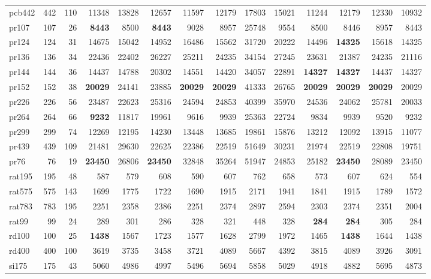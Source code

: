 {\begin{longtable}{l r r r r r r r r r r r r r}
pcb442 & 442 & 110 & 11348 & 13828 & 12657 & 11597 & 12179 & 17803 & 15021 & 11244 & 12179 & 12330 & 10932 \\
pr107 & 107 & 26 & \textbf{8443} & 8500 & \textbf{8443} & 9028 & 8957 & 25748 & 9554 & 8500 & 8446 & 8957 & 8443 \\
pr124 & 124 & 31 & 14675 & 15042 & 14952 & 16486 & 15562 & 31720 & 20222 & 14496 & \textbf{14325} & 15618 & 14325 \\
pr136 & 136 & 34 & 22436 & 22402 & 26227 & 25211 & 24235 & 34154 & 27245 & 23631 & 21387 & 24235 & 21116 \\
pr144 & 144 & 36 & 14437 & 14788 & 20302 & 14551 & 14420 & 34057 & 22891 & \textbf{14327} & \textbf{14327} & 14437 & 14327 \\
pr152 & 152 & 38 & \textbf{20029} & 24141 & 23885 & \textbf{20029} & \textbf{20029} & 41333 & 26765 & \textbf{20029} & \textbf{20029} & \textbf{20029} & 20029 \\
pr226 & 226 & 56 & 23487 & 22623 & 25316 & 24594 & 24853 & 40399 & 35970 & 24536 & 24062 & 25781 & 20033 \\
pr264 & 264 & 66 & \textbf{9232} & 11817 & 19961 & 9616 & 9939 & 25363 & 22724 & 9834 & 9939 & 9520 & 9232 \\
pr299 & 299 & 74 & 12269 & 12195 & 14230 & 13448 & 13685 & 19861 & 15876 & 13212 & 12092 & 13915 & 11077 \\
pr439 & 439 & 109 & 21481 & 29630 & 22625 & 22386 & 22519 & 51649 & 30231 & 21974 & 22519 & 22808 & 19751 \\
pr76 & 76 & 19 & \textbf{23450} & 26806 & \textbf{23450} & 32848 & 35264 & 51947 & 24853 & 25182 & \textbf{23450} & 28089 & 23450 \\
rat195 & 195 & 48 & 587 & 579 & 608 & 590 & 607 & 762 & 658 & 573 & 607 & 624 & 554 \\
rat575 & 575 & 143 & 1699 & 1775 & 1722 & 1690 & 1915 & 2171 & 1941 & 1841 & 1915 & 1789 & 1572 \\
rat783 & 783 & 195 & 2251 & 2358 & 2386 & 2251 & 2374 & 2897 & 2594 & 2303 & 2374 & 2351 & 2004 \\
rat99 & 99 & 24 & 289 & 301 & 286 & 328 & 321 & 448 & 328 & \textbf{284} & \textbf{284} & 305 & 284 \\
rd100 & 100 & 25 & \textbf{1438} & 1567 & 1723 & 1577 & 1628 & 2799 & 1972 & 1465 & \textbf{1438} & 1644 & 1438 \\
rd400 & 400 & 100 & 3619 & 3735 & 3458 & 3721 & 4089 & 5667 & 4392 & 3815 & 4089 & 3926 & 3091 \\
si175 & 175 & 43 & 5060 & 4986 & 4997 & 5496 & 5694 & 5858 & 5029 & 4918 & 4882 & 5695 & 4873 \\

\end{longtable}}
